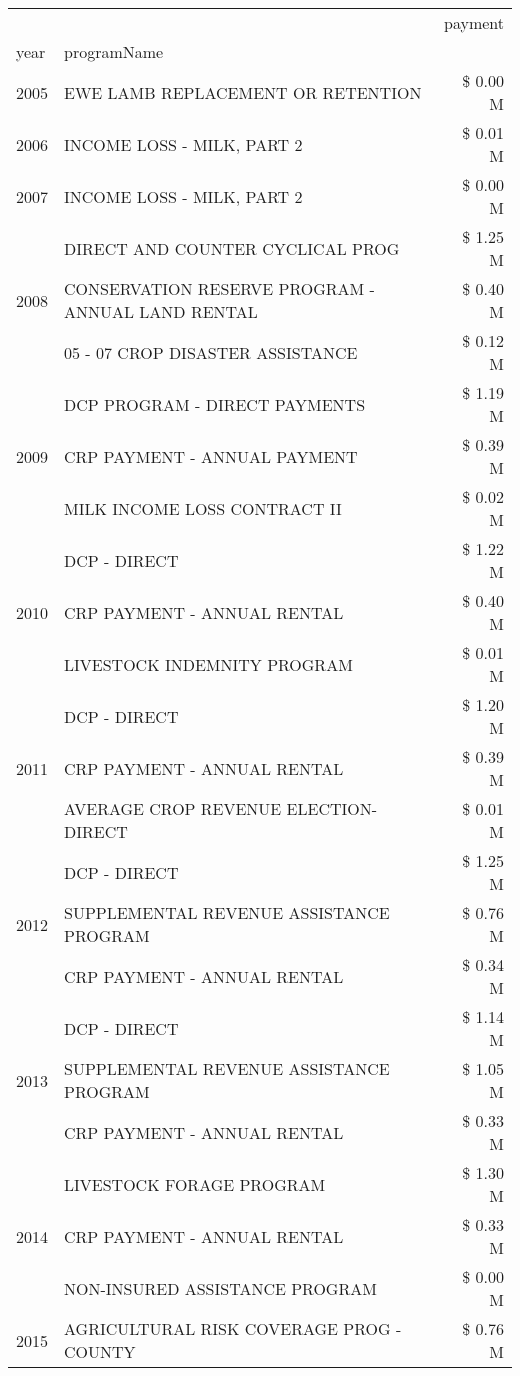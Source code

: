 \begin{tabular}{llr}
\toprule
 &  & payment \\
year & programName &  \\
\midrule
2005 & EWE LAMB REPLACEMENT OR RETENTION & \$ 0.00 M \\
\cline{1-3}
2006 & INCOME LOSS - MILK, PART 2 & \$ 0.01 M \\
\cline{1-3}
2007 & INCOME LOSS - MILK, PART 2 & \$ 0.00 M \\
\cline{1-3}
\multirow[t]{3}{*}{2008} & DIRECT AND COUNTER CYCLICAL PROG & \$ 1.25 M \\
 & CONSERVATION RESERVE PROGRAM - ANNUAL LAND RENTAL & \$ 0.40 M \\
 & 05 - 07 CROP DISASTER ASSISTANCE & \$ 0.12 M \\
\cline{1-3}
\multirow[t]{3}{*}{2009} & DCP PROGRAM - DIRECT PAYMENTS & \$ 1.19 M \\
 & CRP PAYMENT - ANNUAL PAYMENT & \$ 0.39 M \\
 & MILK INCOME LOSS CONTRACT II & \$ 0.02 M \\
\cline{1-3}
\multirow[t]{3}{*}{2010} & DCP - DIRECT & \$ 1.22 M \\
 & CRP PAYMENT - ANNUAL RENTAL & \$ 0.40 M \\
 & LIVESTOCK INDEMNITY PROGRAM & \$ 0.01 M \\
\cline{1-3}
\multirow[t]{3}{*}{2011} & DCP - DIRECT & \$ 1.20 M \\
 & CRP PAYMENT - ANNUAL RENTAL & \$ 0.39 M \\
 & AVERAGE CROP REVENUE ELECTION-DIRECT & \$ 0.01 M \\
\cline{1-3}
\multirow[t]{3}{*}{2012} & DCP - DIRECT & \$ 1.25 M \\
 & SUPPLEMENTAL REVENUE ASSISTANCE PROGRAM & \$ 0.76 M \\
 & CRP PAYMENT - ANNUAL RENTAL & \$ 0.34 M \\
\cline{1-3}
\multirow[t]{3}{*}{2013} & DCP - DIRECT & \$ 1.14 M \\
 & SUPPLEMENTAL REVENUE ASSISTANCE PROGRAM & \$ 1.05 M \\
 & CRP PAYMENT - ANNUAL RENTAL & \$ 0.33 M \\
\cline{1-3}
\multirow[t]{3}{*}{2014} & LIVESTOCK FORAGE PROGRAM & \$ 1.30 M \\
 & CRP PAYMENT - ANNUAL RENTAL & \$ 0.33 M \\
 & NON-INSURED ASSISTANCE PROGRAM & \$ 0.00 M \\
\cline{1-3}
\multirow[t]{3}{*}{2015} & AGRICULTURAL RISK COVERAGE PROG - COUNTY & \$ 0.76 M \\

\end{tabular}
